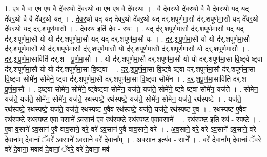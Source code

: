 \documentclass[17pt]{extarticle}
\begin{document}
1. ए॒ष वै वा ए॒ष ए॒ष वै दे॑वर॒थो दे॑वर॒थो वा ए॒ष ए॒ष वै दे॑वर॒थः । . वै दे॑वर॒थो दे॑वर॒थो वै वै दे॑वर॒थो यद् यद् दे॑वर॒थो वै वै दे॑वर॒थो यत् । . दे॒व॒र॒थो यद् यद् दे॑वर॒थो दे॑वर॒थो यद् द॑र्.शपूर्णमा॒सौ द॑र्.शपूर्णमा॒सौ यद् दे॑वर॒थो दे॑वर॒थो यद् द॑र्.शपूर्णमा॒सौ । . दे॒व॒र॒थ इति॑ देव - र॒थः । . यद् द॑र्.शपूर्णमा॒सौ द॑र्.शपूर्णमा॒सौ यद् यद् द॑र्.शपूर्णमा॒सौ यो यो द॑र्.शपूर्णमा॒सौ यद् यद् द॑र्.शपूर्णमा॒सौ यः । . द॒र्॒.श॒पू॒र्ण॒मा॒सौ यो यो द॑र्.शपूर्णमा॒सौ द॑र्.शपूर्णमा॒सौ यो द॑र्.शपूर्णमा॒सौ द॑र्.शपूर्णमा॒सौ यो द॑र्.शपूर्णमा॒सौ द॑र्.शपूर्णमा॒सौ यो द॑र्.शपूर्णमा॒सौ । . द॒र्॒.श॒पू॒र्ण॒मा॒साविति॑ दर्.श - पू॒र्ण॒मा॒सौ । . यो द॑र्.शपूर्णमा॒सौ द॑र्.शपूर्णमा॒सौ यो यो द॑र्.शपूर्णमा॒सा वि॒ष्ट्वे ष्ट्वा द॑र्.शपूर्णमा॒सौ यो यो द॑र्.शपूर्णमा॒सा वि॒ष्ट्वा । . द॒र्॒.श॒पू॒र्ण॒मा॒सा वि॒ष्ट्वे ष्ट्वा द॑र्.शपूर्णमा॒सौ द॑र्.शपूर्णमा॒सा वि॒ष्ट्वा सोमे॑न॒ सोमे॑ने॒ ष्ट्वा द॑र्.शपूर्णमा॒सौ द॑र्.शपूर्णमा॒सा वि॒ष्ट्वा सोमे॑न । . द॒र्॒.श॒पू॒र्ण॒मा॒साविति॑ दर्.श - पू॒र्ण॒मा॒सौ । . इ॒ष्ट्वा सोमे॑न॒ सोमे॑ने॒ ष्ट्वेष्ट्वा सोमे॑न॒ यज॑ते॒ यज॑ते॒ सोमे॑ने॒ ष्ट्वे ष्ट्वा सोमे॑न॒ यज॑ते । . सोमे॑न॒ यज॑ते॒ यज॑ते॒ सोमे॑न॒ सोमे॑न॒ यज॑ते॒ रथ॑स्पष्टे॒ रथ॑स्पष्टे॒ यज॑ते॒ सोमे॑न॒ सोमे॑न॒ यज॑ते॒ रथ॑स्पष्टे । . यज॑ते॒ रथ॑स्पष्टे॒ रथ॑स्पष्टे॒ यज॑ते॒ यज॑ते॒ रथ॑स्पष्ट ए॒वैव रथ॑स्पष्टे॒ यज॑ते॒ यज॑ते॒ रथ॑स्पष्ट ए॒व । . रथ॑स्पष्ट ए॒वैव रथ॑स्पष्टे॒ रथ॑स्पष्ट ए॒वा व॒साने॑ ऽव॒सान॑ ए॒व रथ॑स्पष्टे॒ रथ॑स्पष्ट ए॒वाव॒साने᳚ । . रथ॑स्पष्ट॒ इति॒ रथ॑ - स्प॒ष्टे॒ । . ए॒वा व॒साने॑ ऽव॒सान॑ ए॒वै वाव॒साने॒ वरे॒ वरे॑ ऽव॒सान॑ ए॒वै वाव॒साने॒ वरे᳚ । . अ॒व॒साने॒ वरे॒ वरे॑ ऽव॒साने॑ ऽव॒साने॒ वरे॑ दे॒वाना᳚म् दे॒वानां॒ ॅवरे॑ ऽव॒साने॑ ऽव॒साने॒ वरे॑ दे॒वाना᳚म् । . अ॒व॒सान॒ इत्य॑व - साने᳚ । . वरे॑ दे॒वाना᳚म् दे॒वानां॒ ॅवरे॒ वरे॑ दे॒वाना॒ मवाव॑ दे॒वानां॒ ॅवरे॒ वरे॑ दे॒वाना॒ मव॑ । \newline
\end{document}
